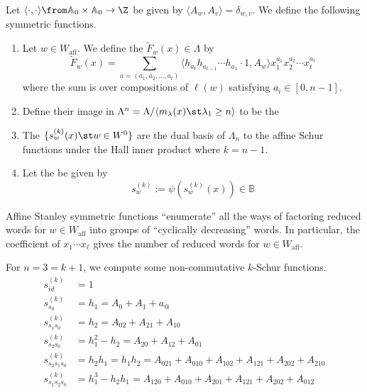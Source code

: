 \documentclass[11pt,leqno,oneside]{amsart}
\numberwithin{thm}{section}
\renewcommand{\W}{W}
\newcommand{\Waff}{\W_{\text{aff}}}
\newcommand{\A}{\mathbb{A}}
\newcommand{\B}{\mathbb{B}}
\newcommand{\sym}{\Lambda}
\begin{document}
\begin{defn}\label{k-schur-def-1}
  Let \(\langle \cdot, \cdot \rangle \from \A_0 \times \A_0 \to
    \Z\) be given by \(\langle A_w, A_v \rangle = \delta_{w,v}\). We
    define the following symmetric functions.
  \begin{enumerate}
  \item Let \(w \in \Waff\). We define the  \(\tilde{F}_w(x) \in \sym\) by
    \[ \tilde{F}_w(x) = \sum_{a = (a_1, a_2, \ldots, a_t)} \langle
      h_{a_t} h_{a_{t-1}} \cdots h_{a_1} \cdot 1, A_w \rangle
      x_1^{a_1} x_2^{a_2} \cdots x_t^{a_t}
    \]
    where the sum is over compositions of \(\ell(w)\) satisfying
    \(a_i \in [0,n-1]\).
  \item Define their image in \(\sym^n = \sym/\langle m_\lambda(x) \st
    \lambda_1 \geq n\rangle\) to be the 
  \item The  \(\{s_w^{(k)}(x) \st w \in \W^0\}\)
  are the dual basis of \(\sym_n\) to the affine Schur functions under
  the Hall inner product where \(k = n-1\).
  \item Let the  be given
    by \[
      s_w^{(k)} := \psi(s_w^{(k)}(x)) \in \B
    \]
  \end{enumerate}
\end{defn}
\begin{rmk}
  Affine Stanley symmetric functions ``enumerate'' all the ways of
  factoring reduced words for \(w \in \Waff\) into groups of
  ``cyclically decreasing'' words. In particular, the coefficient of \(x_1
  \cdots x_\ell\) gives the number of reduced words for \(w \in \Waff\).
\end{rmk}
\begin{example}
  For \(n=3=k+1\), we compute some non-commutative \(k\)-Schur functions.
  \begin{align*}
    s_{id}^{(k)} & = 1 \\
    s_{s_0}^{(k)} & = h_1 = A_0+A_1+a_@ \\
    s_{s_1 s_0}^{(k)} & = h_2 = A_{02}+A_{21}+A_{10}\\
    s_{s_2 s_0}^{(k)} & = h_1^2-h_2=A_{20}+A_{12}+A_{01}\\
    s_{s_2 s_1 s_0}^{(k)} & = h_2h_1 = h_1 h_2 = A_{021}+A_{010}+A_{102}+A_{121}+A_{202}+A_{210}\\
    s_{s_1 s_2 s_0}^{(k)} & = h_1^3-h_2 h_1 = A_{120}+A_{010}+A_{201}+A_{121}+A_{202}+A_{012}
  \end{align*}
\end{example}
\end{document}

